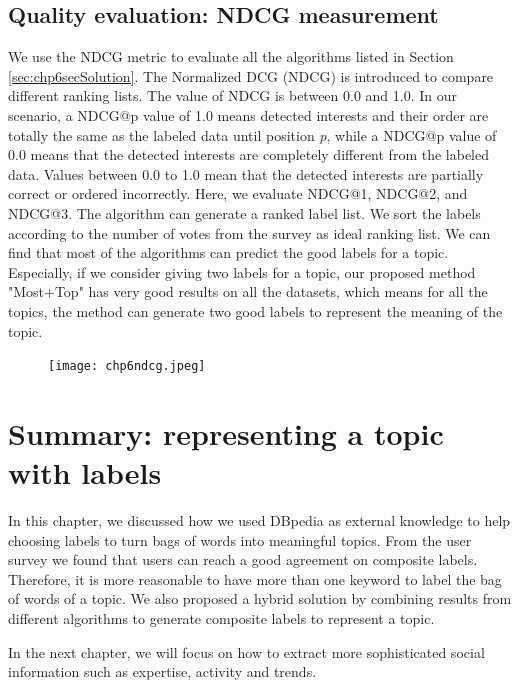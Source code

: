 \subsection{Quality evaluation: NDCG measurement}
We use the NDCG metric to evaluate all the algorithms listed in Section \ref{sec:chp6secSolution}. The Normalized DCG (NDCG) is introduced to compare different ranking lists. The value of NDCG is between 0.0 and 1.0. In our scenario, a NDCG@p value of 1.0 means detected interests and their order are totally the same as the labeled data until position \textit{p}, while a NDCG@p value of 0.0 means that the detected interests are completely different from the labeled data. Values between 0.0 to 1.0 mean that the detected interests are partially correct or ordered incorrectly. 
Here, we evaluate NDCG@1, NDCG@2, and NDCG@3. The algorithm can generate a ranked label list. We sort the labels according to the number of votes from the survey as ideal ranking list. 
We can find that most of the algorithms can predict the good labels for a topic. Especially, if we consider giving two labels for a topic, our proposed method "Most+Top" has very good results on all the datasets, which means for all the topics, the method can generate two good labels to represent the meaning of the topic.


\begin{figure}[htp]
\centering
\texttt{[image: chp6ndcg.jpeg]}  
\caption{}
\label{fig:chp6ndcg} 
\end{figure}




\section{Summary: representing a topic with labels}
In this chapter, we discussed how we used DBpedia as external knowledge to help choosing labels to turn bags of words into meaningful topics. From the user survey we found that users can reach a good agreement on composite labels. Therefore, it is more reasonable to have more than one keyword to label the bag of words of a topic. We also proposed a hybrid solution by combining results from different algorithms to generate composite labels to represent a topic. 

In the next chapter, we will focus on how to extract more sophisticated social information such as expertise, activity and trends.
